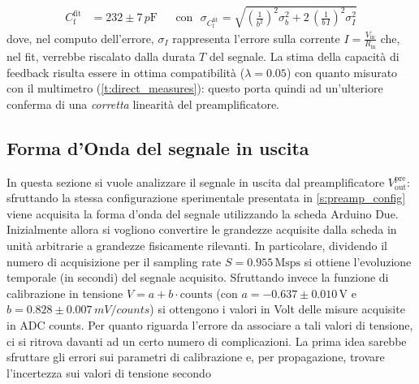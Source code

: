 \documentclass[a4paper,11pt]{article} %
\begin{document}
\begin{align}\label{e:preamp_cf}
	C_{\text{f}}^{\text{fit}}& = 232 \pm 7 \,\si{p\farad} 
	& 
	&\text{con} \,\,\,\, \sigma_{ C_{\text{f}}^{\text{fit}} } = 
	\sqrt
	{ 
		\left(
			\frac{1}{b^2}
		\right)^2
		\sigma_b^2 +
		2 \, \left(
			\frac{1}{b\,I}
		\right)^2
		\sigma_I^2
	}
\end{align}
dove, nel computo dell'errore, $\sigma_I$ rappresenta l'errore sulla corrente $I =
\frac{V_{\text{in}}}{R_{\text{in}}}$ che, nel fit, verrebbe riscalato dalla durata $T$ del segnale. La stima della
capacità di feedback risulta essere in ottima compatibilità ($\lambda = 0.05$) con quanto misurato con il multimetro
(\autoref{t:direct_measures}): questo porta quindi ad un'ulteriore conferma di una \textit{corretta} linearità del
preamplificatore.


\subsection{Forma d'Onda del segnale in uscita}\label{s:preamp_waveform}

In questa sezione si vuole analizzare il segnale in uscita dal preamplificatore $V^{\text{pre}}_{\text{out}}$:
sfruttando la stessa configurazione sperimentale presentata in \autoref{s:preamp_config} viene acquisita la forma d'onda
del segnale utilizzando la scheda Arduino Due. Inizialmente allora si vogliono convertire le grandezze acquisite dalla
scheda in unità arbitrarie a grandezze fisicamente rilevanti. In particolare, dividendo il numero di acquisizione per il
sampling rate $S=0.955\,\text{Msps}$ si ottiene l'evoluzione temporale (in secondi) del segnale acquisito. Sfruttando
invece la funzione di calibrazione in tensione $V= a  +  b \cdot \text{counts}$ (con $a=-0.637 \pm 0.010\,\si{\volt}$ e
$b=0.828\pm0.007\,\si{mV/counts}$) si ottengono i valori in Volt delle misure acquisite in ADC counts. Per quanto
riguarda l'errore da associare a tali valori di tensione, ci si ritrova davanti ad un certo numero di complicazioni. La
prima idea sarebbe sfruttare gli errori sui parametri di calibrazione e, per propagazione, trovare l'incertezza sui
valori di tensione secondo 
\end{document}
